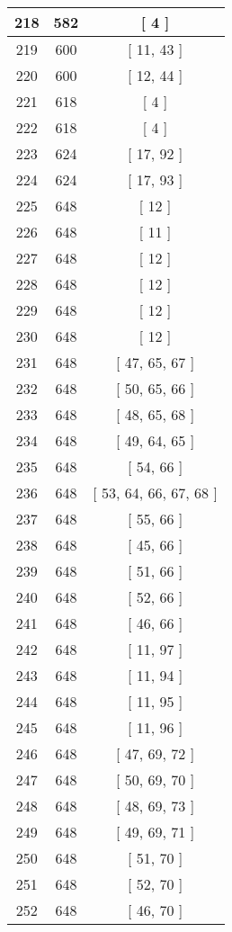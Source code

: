 \begin{center}
\begin{longtable}[H]{|| c c c ||}
\hline
218 & 582 & [ 4 ] \\ 
\hline
219 & 600 & [ 11, 43 ] \\ 
\hline
220 & 600 & [ 12, 44 ] \\ 
\hline
221 & 618 & [ 4 ] \\ 
\hline
222 & 618 & [ 4 ] \\ 
\hline
223 & 624 & [ 17, 92 ] \\ 
\hline
224 & 624 & [ 17, 93 ] \\ 
\hline
225 & 648 & [ 12 ] \\ 
\hline
226 & 648 & [ 11 ] \\ 
\hline
227 & 648 & [ 12 ] \\ 
\hline
228 & 648 & [ 12 ] \\ 
\hline
229 & 648 & [ 12 ] \\ 
\hline
230 & 648 & [ 12 ] \\ 
\hline
231 & 648 & [ 47, 65, 67 ] \\ 
\hline
232 & 648 & [ 50, 65, 66 ] \\ 
\hline
233 & 648 & [ 48, 65, 68 ] \\ 
\hline
234 & 648 & [ 49, 64, 65 ] \\ 
\hline
235 & 648 & [ 54, 66 ] \\ 
\hline
236 & 648 & [ 53, 64, 66, 67, 68 ] \\ 
\hline
237 & 648 & [ 55, 66 ] \\ 
\hline
238 & 648 & [ 45, 66 ] \\ 
\hline
239 & 648 & [ 51, 66 ] \\ 
\hline
240 & 648 & [ 52, 66 ] \\ 
\hline
241 & 648 & [ 46, 66 ] \\ 
\hline
242 & 648 & [ 11, 97 ] \\ 
\hline
243 & 648 & [ 11, 94 ] \\ 
\hline
244 & 648 & [ 11, 95 ] \\ 
\hline
245 & 648 & [ 11, 96 ] \\ 
\hline
246 & 648 & [ 47, 69, 72 ] \\ 
\hline
247 & 648 & [ 50, 69, 70 ] \\ 
\hline
248 & 648 & [ 48, 69, 73 ] \\ 
\hline
249 & 648 & [ 49, 69, 71 ] \\ 
\hline
250 & 648 & [ 51, 70 ] \\ 
\hline
251 & 648 & [ 52, 70 ] \\ 
\hline
252 & 648 & [ 46, 70 ] \\ 
\hline

\end{longtable}
\end{center}
